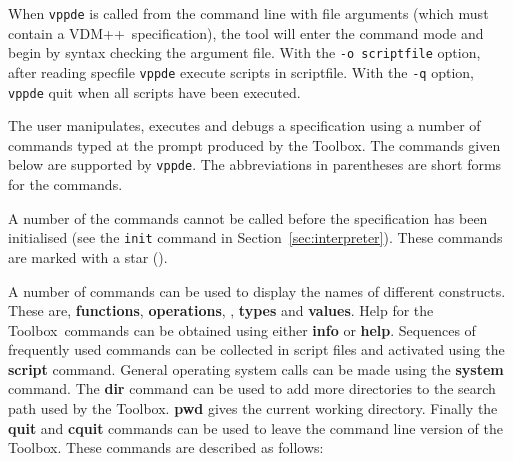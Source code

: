 \documentclass[\pformat,12pt]{article}
\newcommand{\vdmslpp}{VDM++}
\newcommand{\Toolbox}{Toolbox}
\newcommand{\vdmde}{vppde}
\newcommand{\cmd}{\tt }
\begin{document}
When {\tt \vdmde} is called from the command line 
with file arguments (which must contain a \vdmslpp\ 
specification), the tool will enter the command mode and begin by
syntax checking the argument file.
With the {\tt -o scriptfile} option, after reading specfile {\tt \vdmde}
execute scripts in scriptfile. With the {\tt -q} option, {\tt \vdmde} quit
when all scripts have been executed.

The user manipulates, executes and debugs a specification using a
number of commands typed at the prompt produced by the \Toolbox.  The
commands given below are supported by {\tt \vdmde}.  The abbreviations
in parentheses are short forms for the commands.

A number of the commands cannot be called before the specification has
been initialised (see the {\cmd init} command in
Section~\ref{sec:interpreter}).  These commands are marked with a star
({\tt *}).

A number of commands can be used to display the names of different
constructs. These are,
\textbf{functions}, \textbf{operations},
,
\textbf{types} and \textbf{values}.  Help for the \Toolbox\ commands
can be obtained using either \textbf{info} or \textbf{help}. Sequences
of frequently used commands can be collected in script files and
activated using the \textbf{script} command. General operating system
calls can be made using the \textbf{system} command. The \textbf{dir}
command can be used to add more directories to the search path used by
the \Toolbox. \textbf{pwd} gives the current
working directory. Finally the \textbf{quit} and \textbf{cquit}
commands can be used to leave the command line version of the
\Toolbox.  These commands are described as follows:
\end{document}
